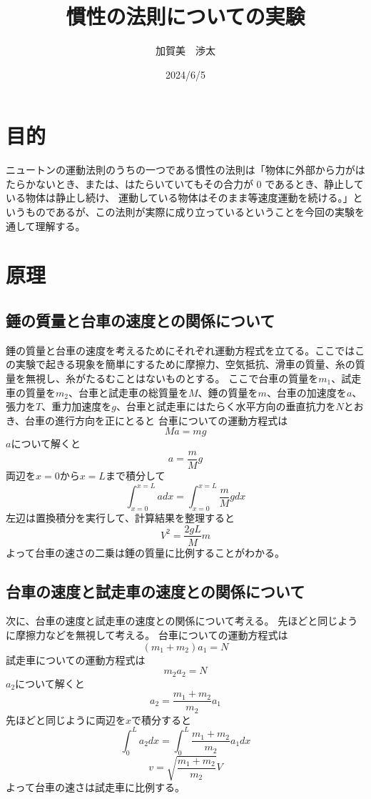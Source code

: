 \documentclass{jlreq}
\begin{document}
\title{慣性の法則についての実験}
\author{加賀美　渉太}
\date{2024/6/5}
\maketitle

\section{目的}

ニュートンの運動法則のうちの一つである慣性の法則は「物体に外部から力がはたらかないとき、または、はたらいていてもその合力が 0 であるとき、静止している物体は静止し続け、
運動している物体はそのまま等速度運動を続ける。」というものであるが、この法則が実際に成り立っているということを今回の実験を通して理解する。

\section{原理}
  \subsection{錘の質量と台車の速度との関係について}
    錘の質量と台車の速度を考えるためにそれぞれ運動方程式を立てる。ここではこの実験で起きる現象を簡単にするために摩擦力、空気抵抗、滑車の質量、糸の質量を無視し、糸がたるむことはないものとする。
    ここで台車の質量を$m_1$、試走車の質量を$m_2$、台車と試走車の総質量を$M$、錘の質量を$m$、台車の加速度を$a$、張力を$T$、重力加速度を$g$、台車と試走車にはたらく水平方向の垂直抗力を$N$とおき、台車の進行方向を正にとると
    台車についての運動方程式は\[Ma=mg\]
    $a$について解くと\[a=\frac{m}{M}g\] 
    両辺を$x=0$から$x=L$まで積分して
    \[\int_{x=0}^{x=L}adx=\int_{x=0}^{x=L}\frac{m}{M}gdx\]
    左辺は置換積分を実行して、計算結果を整理すると\[V^2=\frac{2gL}{M}m\]
    よって台車の速さの二乗は錘の質量に比例することがわかる。
    
  \subsection{台車の速度と試走車の速度との関係について}
    次に、台車の速度と試走車の速度との関係について考える。
    先ほどと同じように摩擦力などを無視して考える。
    台車についての運動方程式は\[(m_1+m_2)a_1=N\]
    試走車についての運動方程式は\[m_2a_2=N\]
    $a_2$について解くと\[a_2=\frac{m_1+m_2}{m_2}a_1\]
    先ほどと同じように両辺を$x$で積分すると
    \[\int_{0}^{L}a_2dx=\int_{0}^{L}\frac{m_1+m_2}{m_2}a_1dx\]
    \[v=\sqrt{\frac{m_1+m_2}{m_2}}V\]
    よって台車の速さは試走車に比例する。
\end{document}
